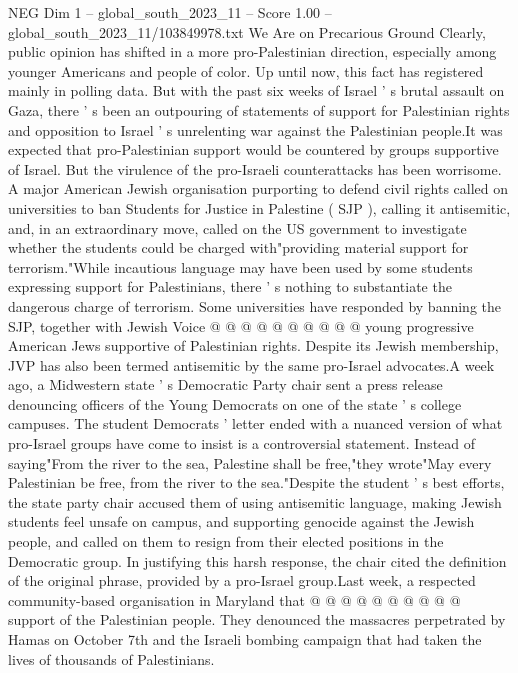 \begin{textsample}{NEG Dim 1 – global\_south\_2023\_11 – Score 1.00 – global\_south\_2023\_11/103849978.txt}  \label{ex:f1_neg_234}
We Are on Precarious Ground Clearly, public opinion has shifted in a more pro-Palestinian direction, especially among younger Americans and people of color.
Up until now, this fact has registered mainly in polling data.
But with the past six weeks of Israel ' s brutal assault on Gaza, there ' s been an outpouring of statements of support for Palestinian rights and opposition to Israel ' s unrelenting war against the Palestinian people.It was expected that pro-Palestinian support would be countered by groups supportive of Israel.
But the virulence of the pro-Israeli counterattacks has been worrisome.
A major American Jewish organisation purporting to defend civil rights called on universities to ban Students for Justice in Palestine ( SJP ), calling it antisemitic, and, in an extraordinary move, called on the US government to investigate whether the students could be charged with"providing material support for terrorism."While incautious language may have been used by some students expressing support for Palestinians, there ' s nothing to substantiate the dangerous charge of terrorism.
Some universities have responded by banning the SJP, together with Jewish Voice @ @ @ @ @ @ @ @ @ @ young progressive American Jews supportive of Palestinian rights.
Despite its Jewish membership, JVP has also been termed antisemitic by the same pro-Israel advocates.A week ago, a Midwestern state ' s Democratic Party chair sent a press release denouncing officers of the Young Democrats on one of the state ' s college campuses.
The student Democrats ' letter ended with a nuanced version of what pro-Israel groups have come to insist is a controversial statement.
Instead of saying"From the river to the sea, Palestine shall be free,"they wrote"May every Palestinian be free, from the river to the sea."Despite the student ' s best efforts, the state party chair accused them of using antisemitic language, making Jewish students feel unsafe on campus, and supporting genocide against the Jewish people, and called on them to resign from their elected positions in the Democratic group.
In justifying this harsh response, the chair cited the definition of the original phrase, provided by a pro-Israel group.Last week, a respected community-based organisation in Maryland that @ @ @ @ @ @ @ @ @ @ support of the Palestinian people.
They denounced the massacres perpetrated by Hamas on October 7th and the Israeli bombing campaign that had taken the lives of thousands of Palestinians.

\end{textsample}

